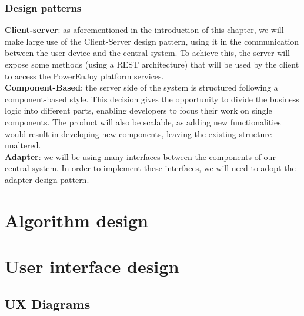 \documentclass{article}
\begin{document}
\subsubsection{Design patterns}
\textbf{Client-server}: as aforementioned in the introduction of this chapter, we will make large use of the Client-Server design pattern, using it in the communication between the user device and the central system. To achieve this, the server will expose some methods (using a REST architecture) that will be used by the client to access the PowerEnJoy platform services.\\
\textbf{Component-Based}: the server side of the system is structured following a component-based style. This decision gives the opportunity to divide the business logic into different parts, enabling developers to focus their work on single components. The product will also be scalable, as adding new functionalities would result in developing new components, leaving the existing structure unaltered.\\
\textbf{Adapter}: we will be using many interfaces between the components of our central system. In order to implement these interfaces, we will need to adopt the adapter design pattern.\\
\newpage
\section{Algorithm design}
\begin{figure}[ht]
\end{figure}
\newpage
\section{User interface design}
\subsection{UX Diagrams}
\begin{figure}[ht]
\end{figure}
\newpage
\begin{figure}[ht]
\end{figure}
\newpage
\end{document}
